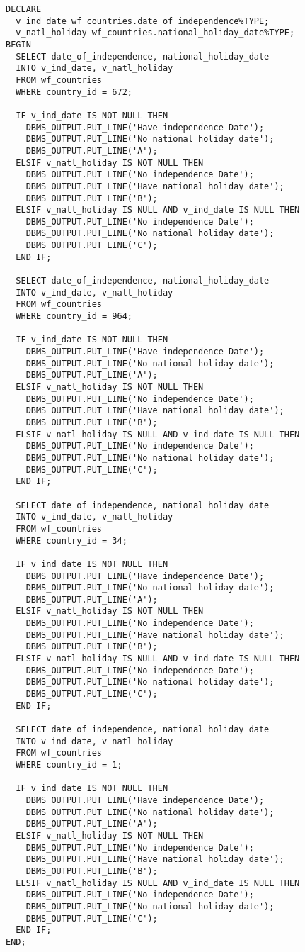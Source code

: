 \documentclass[11pt]{article}
\begin{document}
\begin{verbatim}
DECLARE
  v_ind_date wf_countries.date_of_independence%TYPE;
  v_natl_holiday wf_countries.national_holiday_date%TYPE;
BEGIN
  SELECT date_of_independence, national_holiday_date
  INTO v_ind_date, v_natl_holiday
  FROM wf_countries
  WHERE country_id = 672;

  IF v_ind_date IS NOT NULL THEN
    DBMS_OUTPUT.PUT_LINE('Have independence Date');
    DBMS_OUTPUT.PUT_LINE('No national holiday date');
    DBMS_OUTPUT.PUT_LINE('A');
  ELSIF v_natl_holiday IS NOT NULL THEN
    DBMS_OUTPUT.PUT_LINE('No independence Date');
    DBMS_OUTPUT.PUT_LINE('Have national holiday date');
    DBMS_OUTPUT.PUT_LINE('B');
  ELSIF v_natl_holiday IS NULL AND v_ind_date IS NULL THEN
    DBMS_OUTPUT.PUT_LINE('No independence Date');
    DBMS_OUTPUT.PUT_LINE('No national holiday date');
    DBMS_OUTPUT.PUT_LINE('C');
  END IF;

  SELECT date_of_independence, national_holiday_date
  INTO v_ind_date, v_natl_holiday
  FROM wf_countries
  WHERE country_id = 964;

  IF v_ind_date IS NOT NULL THEN
    DBMS_OUTPUT.PUT_LINE('Have independence Date');
    DBMS_OUTPUT.PUT_LINE('No national holiday date');
    DBMS_OUTPUT.PUT_LINE('A');
  ELSIF v_natl_holiday IS NOT NULL THEN
    DBMS_OUTPUT.PUT_LINE('No independence Date');
    DBMS_OUTPUT.PUT_LINE('Have national holiday date');
    DBMS_OUTPUT.PUT_LINE('B');
  ELSIF v_natl_holiday IS NULL AND v_ind_date IS NULL THEN
    DBMS_OUTPUT.PUT_LINE('No independence Date');
    DBMS_OUTPUT.PUT_LINE('No national holiday date');
    DBMS_OUTPUT.PUT_LINE('C');
  END IF;

  SELECT date_of_independence, national_holiday_date
  INTO v_ind_date, v_natl_holiday
  FROM wf_countries
  WHERE country_id = 34;

  IF v_ind_date IS NOT NULL THEN
    DBMS_OUTPUT.PUT_LINE('Have independence Date');
    DBMS_OUTPUT.PUT_LINE('No national holiday date');
    DBMS_OUTPUT.PUT_LINE('A');
  ELSIF v_natl_holiday IS NOT NULL THEN
    DBMS_OUTPUT.PUT_LINE('No independence Date');
    DBMS_OUTPUT.PUT_LINE('Have national holiday date');
    DBMS_OUTPUT.PUT_LINE('B');
  ELSIF v_natl_holiday IS NULL AND v_ind_date IS NULL THEN
    DBMS_OUTPUT.PUT_LINE('No independence Date');
    DBMS_OUTPUT.PUT_LINE('No national holiday date');
    DBMS_OUTPUT.PUT_LINE('C');
  END IF;

  SELECT date_of_independence, national_holiday_date
  INTO v_ind_date, v_natl_holiday
  FROM wf_countries
  WHERE country_id = 1;

  IF v_ind_date IS NOT NULL THEN
    DBMS_OUTPUT.PUT_LINE('Have independence Date');
    DBMS_OUTPUT.PUT_LINE('No national holiday date');
    DBMS_OUTPUT.PUT_LINE('A');
  ELSIF v_natl_holiday IS NOT NULL THEN
    DBMS_OUTPUT.PUT_LINE('No independence Date');
    DBMS_OUTPUT.PUT_LINE('Have national holiday date');
    DBMS_OUTPUT.PUT_LINE('B');
  ELSIF v_natl_holiday IS NULL AND v_ind_date IS NULL THEN
    DBMS_OUTPUT.PUT_LINE('No independence Date');
    DBMS_OUTPUT.PUT_LINE('No national holiday date');
    DBMS_OUTPUT.PUT_LINE('C');
  END IF;
END;
\end{verbatim}
\end{document}
